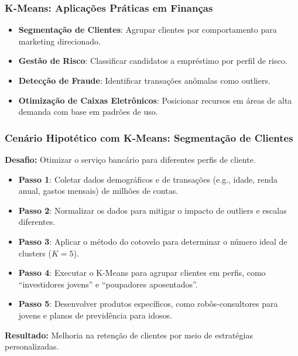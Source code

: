 \documentclass{beamer}
\begin{document}
\begin{frame}
    \frametitle{K-Means: Aplicações Práticas em Finanças}
    \begin{itemize}
        \item \textbf{Segmentação de Clientes}: Agrupar clientes por comportamento para marketing direcionado.
        \item \textbf{Gestão de Risco}: Classificar candidatos a empréstimo por perfil de risco.
        \item \textbf{Detecção de Fraude}: Identificar transações anômalas como outliers.
        \item \textbf{Otimização de Caixas Eletrônicos}: Posicionar recursos em áreas de alta demanda com base em padrões de uso.
    \end{itemize}
\end{frame}

\begin{frame}
    \frametitle{Cenário Hipotético com K-Means: Segmentação de Clientes}
    \textbf{Desafio:} Otimizar o serviço bancário para diferentes perfis de cliente.
\begin{itemize}
        \item \textbf{Passo 1}: Coletar dados demográficos e de transações (e.g., idade, renda anual, gastos mensais) de milhões de contas.
        \item \textbf{Passo 2}: Normalizar os dados para mitigar o impacto de outliers e escalas diferentes.
        \item \textbf{Passo 3}: Aplicar o método do cotovelo para determinar o número ideal de clusters (\( K = 5 \)).
        \item \textbf{Passo 4}: Executar o K-Means para agrupar clientes em perfis, como ``investidores jovens'' e ``poupadores aposentados''.
        \item \textbf{Passo 5}: Desenvolver produtos específicos, como robôs-consultores para jovens e planos de previdência para idosos.
    \end{itemize}
    \textbf{Resultado:} Melhoria na retenção de clientes por meio de estratégias personalizadas.
\end{frame}
\end{document}
